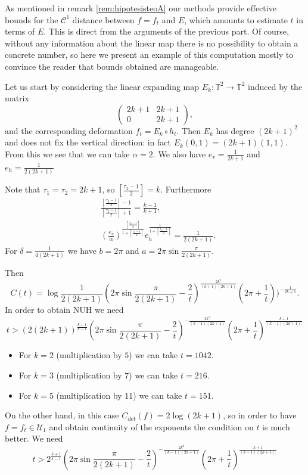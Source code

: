 \documentclass[11pt,letterpaper,reqno]{article}
\newcommand{\Tor}{\mathbb{T}^2}
\begin{document}
As mentioned in remark \ref{rem:hipotesisteoA} our methods provide effective bounds for the $\mathcal C^1$ distance between $f=f_t$ and $E$, which amounts to estimate $t$ in terms of $E$. This is direct from the arguments of the previous part. Of course, without any information about the linear map there is no possibility to obtain a concrete number, so here we present an example of this computation mostly to convince the reader that bounds obtained are manageable.


Let us start by considering the linear expanding map $E_k:\Tor\to\Tor$ induced by the matrix 
\[
	\begin{pmatrix}
	2k+1 & 2k+1\\
	0 & 2k+1
	\end{pmatrix},
\]
and the corresponding deformation $f_t=E_k\circ h_t$. Then $E_k$ has degree $(2k+1)^2$ and does not fix the vertical direction: in fact $E_k(0,1)=(2k+1)(1,1)$. \color{black}From this we see that we can take $\alpha=2$. We also have $e_v=\frac 1{2k+1}$ and $e_h=\frac 1{2(2k+1)}$


Note that $\tau_1=\tau_2=2k+1$, so $\left[\frac{\tau_2-1}2\right]=k$. Furthermore
\begin{align*}
&\frac{\left[\frac{\tau_2-1}2\right]-1}{\left[\frac{\tau_2-1}2\right]+1}=\frac{k-1}{k+1},\\
&\left(\frac{e_v}{\alpha}\right)^{\frac{\left[\frac{\tau_2-1}2\right]}{1+\left[\frac{\tau_2-1}2\right]}}e_h^{\frac 1{1+\left[\frac{\tau_2-1}2\right]}}=\frac 1{2(2k+1)}.
\end{align*}
For $\delta=\frac 1{4(2k+1)}$ we have $b=2\pi$ and $a=2\pi\sin\frac{\pi}{2(2k+1)}$.

Then 
\[
C(t)=\log\frac 1{2(2k+1)}\left(2\pi\sin\frac{\pi}{2(2k+1)}-\frac 2t\right)^{\frac{2k^2}{(k+1)(2k+1)}}\left(2\pi+\frac 1t\right))^{-\frac 1{2k+1}}.
\]
In order to obtain NUH we need
\[
t>\left(2(2k+1)\right)^{\frac{k+1}{k-1}}\left(2\pi\sin\frac{\pi}{2(2k+1)}-\frac 2t\right)^{-\frac{2k^2}{(k-1)(2k+1)}}\left(2\pi+\frac 1t\right)^{\frac {k+1}{(k-1)(2k+1).}}
\]

\begin{itemize}
	\item For $k=2$ (multiplication by $5$) we can take $t=1042$.
	\item For $k=3$ (multiplication by $7$) we can take $t=216$.
    \item For $k=5$ (multiplication by $11$) we can take $t=151$.
\end{itemize}


On the other hand, in this case $C_{\det}(f)=2\log (2k+1)$, so in order to have $f=f_t\in\mathcal U_1$ and obtain continuity of the exponents the condition on $t$ is much better. We need
\[
t>2^{\frac{k+1}{k-1}}\left(2\pi\sin\frac{\pi}{2(2k+1)}-\frac 2t\right)^{-\frac{2k^2}{(k-1)(2k+1)}}\left(2\pi+\frac 1t\right)^{\frac {k+1}{(k-1)(2k+1).}}
\]
\end{document}
